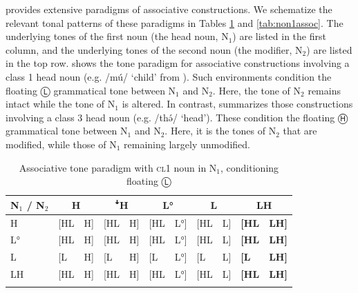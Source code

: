 \documentclass[output=paper,colorlinks,citecolor=brown,draft,draftmode]{langscibook}
\begin{document}
\citet{nissim1981} provides extensive paradigms of associative constructions. 
We schematize the relevant tonal patterns of these paradigms in Tables \ref{tab:cl1assoc} and \ref{tab:non1assoc}.
The underlying tones of the first noun (the head noun, N$_1$) are listed in the first column, and the underlying tones of the second noun (the modifier, N$_2$) are listed in the top row. 
 shows the tone paradigm for associative constructions involving a class 1 head noun (e.g. /m\'{u}/ `child' from ).
Such environments condition the floating  Ⓛ  grammatical tone between  N$_1$ and  N$_2$.
Here, the tone of N$_2$ remains intact while the tone of   N$_1$  is altered.
In contrast,  summarizes those constructions involving a class 3 head noun (e.g. /th\'ə/ `head').
These condition the floating Ⓗ  grammatical tone  between  N$_1$ and  N$_2$.
Here, it is the tones of N$_2$ that are modified, while those of N$_1$ remaining largely unmodified.

\begin{table}
\caption{Associative tone paradigm with \textsc{cl1} noun in N$_1$, conditioning floating Ⓛ}
\label{tab:cl1assoc}
 \begin{tabularx}{.9\textwidth}{X lr lr lr lr lr}
  \lsptoprule
N$_1$ / N$_2$  & \multicolumn{2}{c}{H} &  \multicolumn{2}{c}{ꜜH} & \multicolumn{2}{c}{L°}  &\multicolumn{2}{c}{L}  & \multicolumn{2}{c}{\textbf{LH}} \\
\midrule
H &   {[}HL & H{]} & {[}HL & H{]} & {[}HL & L°{]} & {[}HL & L{]} & \textbf{{[}HL} & \textbf{{LH}{]} }\\
L° &   {[}HL & H{]} & {[}HL & H{]} & {[}HL & L°{]} & {[}HL & L{]} & \textbf{{[}HL }&\textbf{ {LH}{]}} \\
L &   {[}L & H{]} & {[}L & H{]} & {[}L & L°{]} & {[}L & L{]} & \textbf{{[}L }&\textbf{ {LH}{]}} \\
LH &   {[}HL & H{]} & {[}HL & H{]} & {[}HL & L°{]} & {[}HL & L{]} & \textbf{{[}HL }& \textbf{{LH}{]}} \\
  \lspbottomrule
 \end{tabularx}
\end{table}
 
\end{document}
